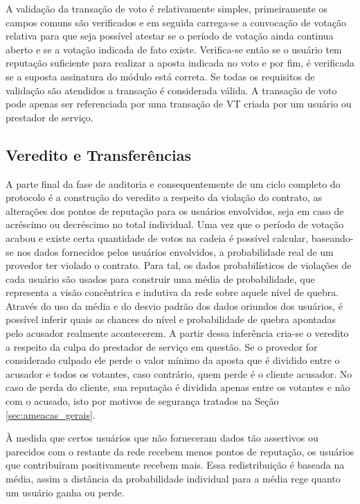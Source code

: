%
A validação da transação de voto é relativamente simples, primeiramente os campos comuns são verificados e em seguida carrega-se a convocação de votação relativa para que seja possível atestar se o período de votação ainda continua aberto e se a votação indicada de fato existe. Verifica-se então se o usuário tem reputação suficiente para realizar a aposta indicada no voto e por fim, é verificada se a suposta assinatura do módulo está correta. Se todas os requisitos de validação são atendidos a transação é considerada válida. A transação de voto pode apenas ser referenciada por uma transação de \ac{VT} criada por um usuário ou prestador de serviço.


\subsection{Veredito e Transferências}
\label{sec:proposta:auditoria:vt}

A parte final da fase de auditoria e consequentemente de um ciclo completo do protocolo é a construção do veredito a respeito da violação do contrato, as alterações dos pontos de reputação para os usuários envolvidos, seja em caso de acréscimo ou decréscimo no total individual. Uma vez que o período de votação acabou e existe certa quantidade de votos na cadeia é possível calcular, baseando-se nos dados fornecidos pelos usuários envolvidos, a probabilidade real de um provedor ter violado o contrato. Para tal, os dados probabilísticos de violações de cada usuário são usados para construir uma média de probabilidade, que representa a visão concêntrica e indutiva da rede sobre aquele nível de quebra. Através do uso da média e do desvio padrão dos dados oriundos dos usuários, é possível inferir quais as chances do nível e probabilidade de quebra apontadas pelo acusador realmente acontecerem. A partir dessa inferência cria-se o veredito a respeito da culpa do prestador de serviço em questão. Se o provedor for considerado culpado ele perde o valor mínimo da aposta que é dividido entre o acusador e todos os votantes, caso contrário, quem perde é o cliente acusador. No caso de perda do cliente, sua reputação é dividida apenas entre os votantes e não com o acusado, isto por motivos de segurança tratados na Seção \ref{sec:ameacas_gerais}. 

%
À medida que certos usuários que não forneceram dados tão assertivos ou parecidos com o restante da rede recebem menos pontos de reputação, os usuários que contribuíram positivamente recebem mais. Essa redistribuição é baseada na média, assim a distância da probabilidade individual para a média rege quanto um usuário ganha ou perde.

